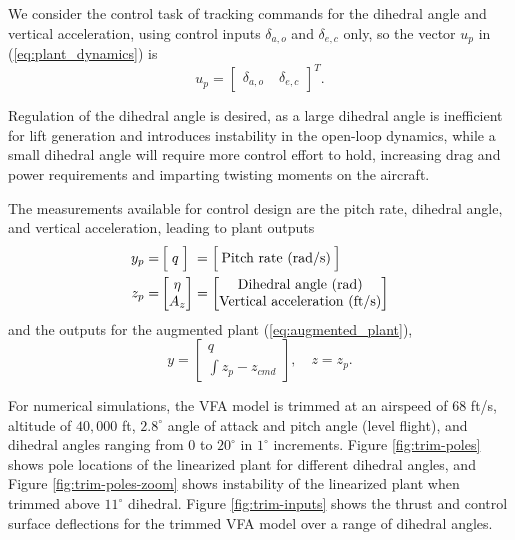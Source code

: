 We consider the control task of tracking commands for the dihedral angle and vertical acceleration, using control inputs $\delta_{a,o}$ and $\delta_{e,c}$ only, so the vector $u_p$ in (\ref{eq:plant_dynamics}) is
\begin{equation}
	u_p = \begin{bmatrix}
\delta_{a,o} & \; \delta_{e,c}
\end{bmatrix}^T.
\end{equation}

Regulation of the dihedral angle is desired, as a large dihedral angle is inefficient for lift generation and introduces instability in the open-loop dynamics, while a small dihedral angle will require more control effort to hold, increasing drag and power requirements and imparting twisting moments on the aircraft. 

The measurements available for control design are the pitch rate, dihedral angle, and vertical acceleration, leading to plant outputs
\begin{equation}
\begin{aligned}
y_p =& \, \Big[\; q \; \Big] \;= \Big[\: \text{Pitch rate (rad/s)} \:\Big] \\
z_p =& \begin{bmatrix}
\eta \\
A_z
\end{bmatrix} =\begin{bmatrix}
	$Dihedral angle (rad)$\\
	$Vertical acceleration (ft/s)$
\end{bmatrix}		
\end{aligned}
\end{equation}
and the outputs for the augmented plant (\ref{eq:augmented_plant}),
\begin{equation}
y = \begin{bmatrix}
	q \\ \int{z_p - z_{cmd}}
\end{bmatrix}, \quad z = z_p.
\end{equation}

For numerical simulations, the VFA model is trimmed at an airspeed of $68$ ft/s, altitude of $40,000$ ft, $2.8^\circ$ angle of attack and pitch angle (level flight), and dihedral angles ranging from $0$ to $20^\circ$ in $1^\circ$ increments. Figure \ref{fig:trim-poles} shows pole locations of the linearized plant for different dihedral angles, and Figure \ref{fig:trim-poles-zoom} shows instability of the linearized plant when trimmed above $11^\circ$ dihedral. Figure \ref{fig:trim-inputs} shows the thrust and control surface deflections for the trimmed VFA model over a range of dihedral angles.

